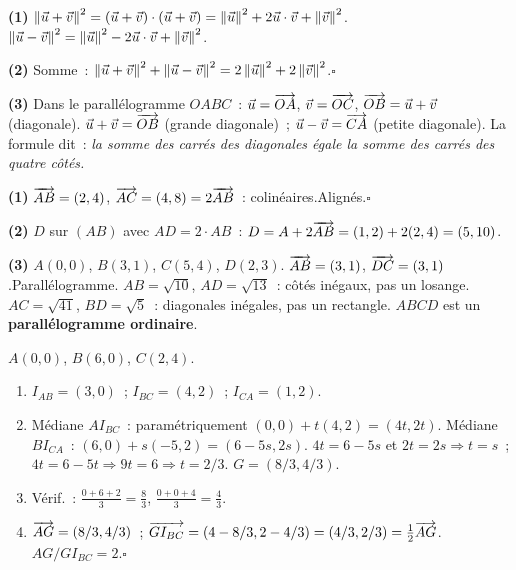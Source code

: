 
\textbf{(1)} $\left\|\vec{u}+\vec{v}\right\|^2=(\vec{u}+\vec{v})\cdot(\vec{u}+\vec{v})
=\left\|\vec{u}\right\|^2+2\vec{u}\cdot\vec{v}+\left\|\vec{v}\right\|^2$.
$\left\|\vec{u}-\vec{v}\right\|^2=\left\|\vec{u}\right\|^2-2\vec{u}\cdot\vec{v}+\left\|\vec{v}\right\|^2$.

\textbf{(2)} Somme~: $\left\|\vec{u}+\vec{v}\right\|^2+\left\|\vec{u}-\vec{v}\right\|^2
=2\left\|\vec{u}\right\|^2+2\left\|\vec{v}\right\|^2$.\hfill$\square$

\textbf{(3)} Dans le parall\'elogramme $OABC$~:
$\vec{u}=\overrightarrow{OA}$, $\vec{v}=\overrightarrow{OC}$, $\overrightarrow{OB}=\vec{u}+\vec{v}$ (diagonale).
$\vec{u}+\vec{v}=\overrightarrow{OB}$ (grande diagonale)~;
$\vec{u}-\vec{v}=\overrightarrow{CA}$ (petite diagonale).
La formule dit~: \emph{la somme des carr\'es des diagonales
\'egale la somme des carr\'es des quatre c\^ot\'es.}


\textbf{(1)} $\overrightarrow{AB}=(2,4)$, $\overrightarrow{AC}=(4,8)=2\overrightarrow{AB}$~: colin\'eaires.\checkmark\quad Align\'es.\hfill$\square$

\textbf{(2)} $D$ sur $(AB)$ avec $AD=2\cdot AB$~: $D=A+2\overrightarrow{AB}=(1,2)+2(2,4)=(5,10)$.

\textbf{(3)} $A(0,0)$, $B(3,1)$, $C(5,4)$, $D(2,3)$.
$\overrightarrow{AB}=(3,1)$, $\overrightarrow{DC}=(3,1)$.\checkmark\quad Parall\'elogramme.
$AB=\sqrt{10}$, $AD=\sqrt{13}$~: c\^ot\'es in\'egaux, pas un losange.
$AC=\sqrt{41}$, $BD=\sqrt{5}$~: diagonales in\'egales, pas un rectangle.
$ABCD$ est un \textbf{parall\'elogramme ordinaire}.


$A(0,0)$, $B(6,0)$, $C(2,4)$.
\begin{enumerate}
  \item $I_{AB}=(3,0)$~; $I_{BC}=(4,2)$~; $I_{CA}=(1,2)$.
  \item M\'ediane $AI_{BC}$~: param\'etriquement $(0,0)+t(4,2)=(4t,2t)$.
        M\'ediane $BI_{CA}$~: $(6,0)+s(-5,2)=(6-5s,2s)$.
        $4t=6-5s$ et $2t=2s\Rightarrow t=s$~; $4t=6-5t\Rightarrow9t=6\Rightarrow t=2/3$.
        $G=(8/3,4/3)$.
  \item V\'erif.~: $\tfrac{0+6+2}{3}=\tfrac{8}{3}$, $\tfrac{0+0+4}{3}=\tfrac{4}{3}$.\checkmark
  \item $\overrightarrow{AG}=(8/3,4/3)$~; $\overrightarrow{GI_{BC}}=(4-8/3,2-4/3)=(4/3,2/3)=\frac{1}{2}\overrightarrow{AG}$.
        $AG/GI_{BC}=2$.\hfill$\square$
\end{enumerate}

